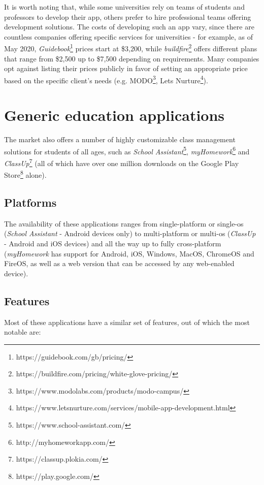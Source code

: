         It is worth noting that, while some universities rely on teams of students and professors to develop their app, others prefer to hire professional teams offering development solutions. The costs of developing such an app vary, since there are countless companies offering specific services for universities - for example, as of May 2020, \textit{Guidebook}\footnote{https://guidebook.com/gb/pricing/} prices start at \$3,200, while \textit{buildfire}\footnote{https://buildfire.com/pricing/white-glove-pricing/} offers different plans that range from \$2,500 up to \$7,500 depending on requirements. Many companies opt against listing their prices publicly in favor of setting an appropriate price based on the specific client's needs (e.g. MODO\footnote{https://www.modolabs.com/products/modo-campus/}, Lets Nurture\footnote{https://www.letsnurture.com/services/mobile-app-development.html}).

\section{Generic education applications} \label{2:generic_apps}
    The market also offers a number of highly customizable class management solutions for students of all ages, such as \textit{School Assistant}\footnote{https://www.school-assistant.com/}, \textit{myHomework}\footnote{http://myhomeworkapp.com/} and \textit{ClassUp}\footnote{https://classup.plokia.com/} (all of which have over one million downloads on the Google Play Store\footnote{https://play.google.com/} alone).
    
    \subsection{Platforms} \label{2:generic_apps_platforms}
        The availability of these applications ranges from single-platform or single-\acrshort{os} (\textit{School Assistant} - Android devices only) to multi-platform or multi-\acrshort{os} (\textit{ClassUp} - Android and iOS devices) and all the way up to fully cross-platform (\textit{myHomework} has support for Android, iOS, Windows, MacOS, ChromeOS and FireOS, as well as a web version that can be accessed by any web-enabled device).
        
    \subsection{Features} \label{2:generic_apps_features}
        Most of these applications have a similar set of features, out of which the most notable are:
        
